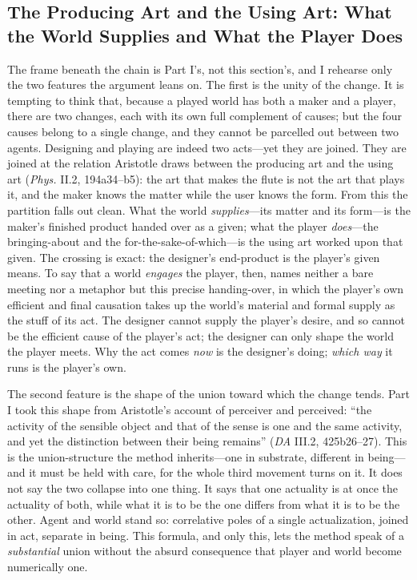 \documentclass{article}
\begin{document}
\subsection{The Producing Art and the Using Art: What the World Supplies and What the Player Does}

The frame beneath the chain is Part I's, not this section's, and I rehearse only the two features the argument leans on. The first is the unity of the change. It is tempting to think that, because a played world has both a maker and a player, there are two changes, each with its own full complement of causes; but the four causes belong to a single change, and they cannot be parcelled out between two agents. Designing and playing are indeed two acts---yet they are joined. They are joined at the relation Aristotle draws between the producing art and the using art (\textit{Phys.} II.2, 194a34--b5): the art that makes the flute is not the art that plays it, and the maker knows the matter while the user knows the form. From this the partition falls out clean. What the world \textit{supplies}---its matter and its form---is the maker's finished product handed over as a given; what the player \textit{does}---the bringing-about and the for-the-sake-of-which---is the using art worked upon that given. The crossing is exact: the designer's end-product is the player's given means. To say that a world \textit{engages} the player, then, names neither a bare meeting nor a metaphor but this precise handing-over, in which the player's own efficient and final causation takes up the world's material and formal supply as the stuff of its act. The designer cannot supply the player's desire, and so cannot be the efficient cause of the player's act; the designer can only shape the world the player meets. Why the act comes \textit{now} is the designer's doing; \textit{which way} it runs is the player's own.

The second feature is the shape of the union toward which the change tends. Part I took this shape from Aristotle's account of perceiver and perceived: ``the activity of the sensible object and that of the sense is one and the same activity, and yet the distinction between their being remains'' (\textit{DA} III.2, 425b26--27). This is the union-structure the method inherits---one in substrate, different in being---and it must be held with care, for the whole third movement turns on it. It does not say the two collapse into one thing. It says that one actuality is at once the actuality of both, while what it is to be the one differs from what it is to be the other. Agent and world stand so: correlative poles of a single actualization, joined in act, separate in being. This formula, and only this, lets the method speak of a \textit{substantial} union without the absurd consequence that player and world become numerically one.
\end{document}
